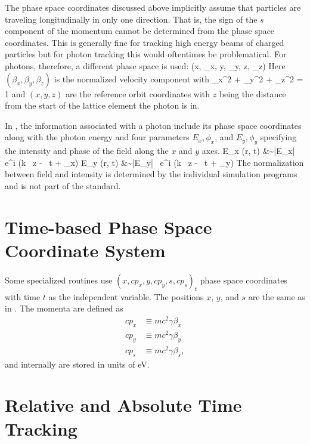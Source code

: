 The phase space coordinates discussed above implicitly assume that
particles are traveling longitudinally in only one direction. That is,
the sign of the $s$ component of the momentum cannot be determined
from the phase space coordinates. This is generally fine for tracking
high energy beams of charged particles but for photon tracking this
would oftentimes be problematical. For photons, therefore, a different
phase space is used:
\Begineq
  (x, \beta_x, y, \beta_y, z, \beta_z)
\Endeq
Here $(\beta_x, \beta_y, \beta_z)$ is the normalized velocity component with
\Begineq
  \beta_x^2 + \beta_y^2 + \beta_z^2 = 1 
\Endeq
and $(x, y, z)$ are the reference orbit coordinates with $z$ being the
distance from the start of the lattice element the photon is in.

In \bmad, the information associated with a photon include its phase
space coordinates along with the photon energy and four parameters
$E_x, \phi_x$, and $E_y, \phi_y$ specifying the intensity and phase of
the field along the $x$ and $y$ axes.
\Begineqs
  E_x (\Bf r, t) &\sim |E_x| \, e^{i (k \, z - \omega \, t + \phi_x)} \CRNO
  E_y (\Bf r, t) &\sim |E_y| \, e^{i (k \, z - \omega \, t + \phi_y)} \CRNO
\Endeqs
The normalization between field and intensity is determined by the
individual simulation programs and is not part of the \bmad standard.

\section{Time-based Phase Space Coordinate System}
\label{s:time.phase.space}

Some specialized routines use $(x, c p_x, y, c p_y, s, c p_s)_t$ phase
space coordinates with time $t$ as the independent variable. The
positions $x$, $y$, and $s$ are the same as in
. The momenta are defined as
\begin{align}
c p_x &\equiv m c^2 \gamma \beta_x \\
c p_y &\equiv m c^2 \gamma \beta_y \\
c p_s &\equiv m c^2 \gamma \beta_s,
\end{align}
and internally are stored in units of eV.

\section{Relative and Absolute Time Tracking}
\label{s:rf.time}

